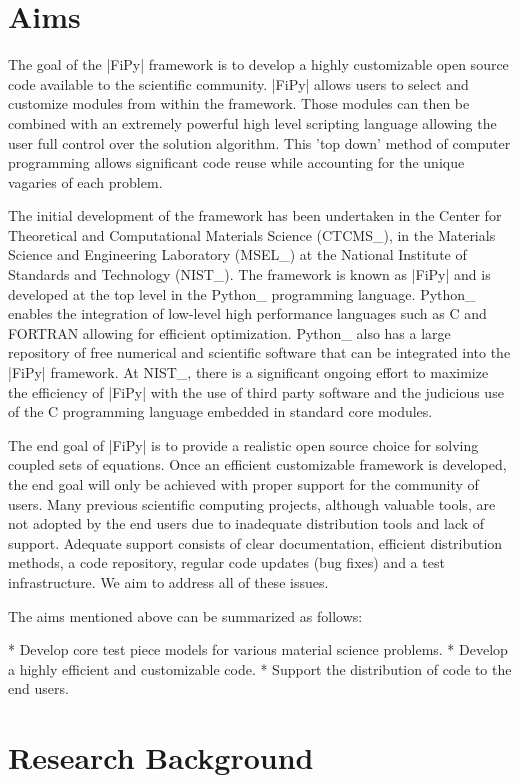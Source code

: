\section{Aims}

The goal of the |FiPy| framework is to develop a highly customizable
open source code available to the scientific community. |FiPy| allows
users to select and customize modules from within the framework. Those
modules can then be combined with an extremely powerful high level
scripting language allowing the user full control over the solution
algorithm. This 'top down' method of computer programming allows
significant code reuse while accounting for the unique vagaries of
each problem.

The initial development of the framework has been undertaken in the
Center for Theoretical and Computational Materials Science (CTCMS_),
in the Materials Science and Engineering Laboratory (MSEL_) at the
National Institute of Standards and Technology (NIST_). The framework
is known as |FiPy| and is developed at the top level in the Python_
programming language. Python_ enables the integration of low-level
high performance languages such as C and FORTRAN allowing for
efficient optimization. Python_ also has a large repository of free
numerical and scientific software that can be integrated into the
|FiPy| framework. At NIST_, there is a significant ongoing effort to
maximize the efficiency of |FiPy| with the use of third party software
and the judicious use of the C programming language embedded in
standard core modules.

The end goal of |FiPy| is to provide a realistic open source choice
for solving coupled sets of equations. Once an efficient customizable
framework is developed, the end goal will only be achieved with proper
support for the community of users. Many previous scientific computing
projects, although valuable tools, are not adopted by the end users
due to inadequate distribution tools and lack of support. Adequate
support consists of clear documentation, efficient distribution
methods, a code repository, regular code updates (bug fixes) and a
test infrastructure. We aim to address all of these issues.

The aims mentioned above can be summarized as follows:

* Develop core test piece models for various material science problems.
* Develop a highly efficient and customizable code.
* Support the distribution of code to the end users.

\section{Research Background}

